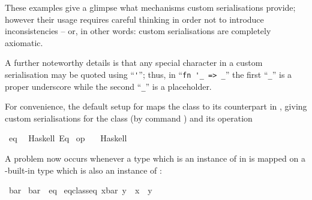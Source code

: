 \begin{isabellebody}
\begin{isamarkuptext}
  These examples give a glimpse what mechanisms custom serialisations
  provide; however their usage requires careful thinking in order not
  to introduce inconsistencies -- or, in other words: custom
  serialisations are completely axiomatic.

  A further noteworthy details is that any special character in a
  custom serialisation may be quoted using ``\verb|'|''; thus,
  in ``\verb|fn '_ => _|'' the first ``\verb|_|'' is a
  proper underscore while the second ``\verb|_|'' is a
  placeholder.%
\end{isamarkuptext}%
\isamarkuptrue%
%
\isamarkuptrue%
%
\begin{isamarkuptext}%
For convenience, the default  setup for 
  maps the  class to its counterpart in ,
  giving custom serialisations for the class  (by command
  \hypertarget{command.code-class}{\hyperlink{command.code-class}{\mbox{}}}) and its operation %
\end{isamarkuptext}%
\isamarkuptrue%
%
\isadelimquotett
%
\endisadelimquotett
%
\isatagquotett
{}\isamarkupfalse%
\ eq\isanewline
\ \ {\isacharparenleft}Haskell\ {\isachardoublequoteopen}Eq{\isachardoublequoteclose}{\isacharparenright}\isanewline
\isanewline
{}\isamarkupfalse%
\ {\isachardoublequoteopen}op\ {\isacharequal}{\isachardoublequoteclose}\isanewline
\ \ {\isacharparenleft}Haskell\ \ {}\ {\isachardoublequoteopen}{\isacharequal}{\isacharequal}{\isachardoublequoteclose}{\isacharparenright}%
\endisatagquotett
{\isafoldquotett}%
%
\isadelimquotett
%
\endisadelimquotett
%
\begin{isamarkuptext}%
\noindent A problem now occurs whenever a type which is an instance
  of  in  is mapped on a -built-in type which is also an instance of 
  :%
\end{isamarkuptext}%
\isamarkuptrue%
%
\isadelimquote
%
\endisadelimquote
%
\isatagquote
{}\isamarkupfalse%
\ bar\isanewline
\isanewline
{}\isamarkupfalse%
\ bar\ {\isacharcolon}{\isacharcolon}\ eq\isanewline
{}\isanewline
\isanewline
{}\isamarkupfalse%
\ {\isachardoublequoteopen}eq{\isacharunderscore}class{\isachardot}eq\ {\isacharparenleft}x{\isasymColon}bar{\isacharparenright}\ y\ {\isasymlongleftrightarrow}\ x\ {\isacharequal}\ y{\isachardoublequoteclose}\isanewline

\end{isabellebody}
